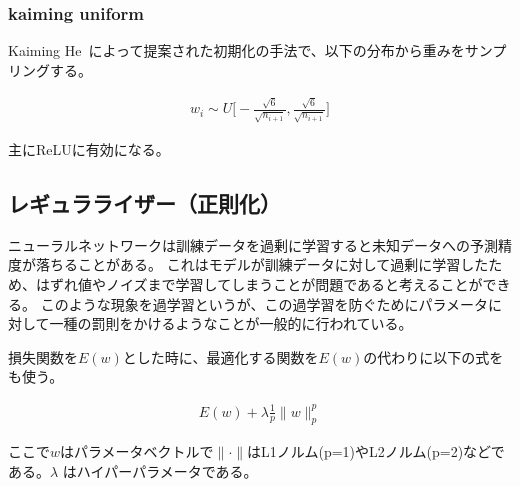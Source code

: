 \subsubsection{kaiming uniform}
Kaiming He~\cite{kaiming}によって提案された初期化の手法で、以下の分布から重みをサンプリングする。

\begin{eqnarray}
w_{i} \sim U \bigl[ - \frac{\sqrt{6}}{ \sqrt{n_{i+1}} }, \frac{\sqrt{6}}{ \sqrt{ n_{i+1} }} \bigr]
\end{eqnarray}

主にReLUに有効になる。


\subsection{レギュラライザー（正則化）}
ニューラルネットワークは訓練データを過剰に学習すると未知データへの予測精度が落ちることがある。
これはモデルが訓練データに対して過剰に学習したため、はずれ値やノイズまで学習してしまうことが問題であると考えることができる。
このような現象を過学習というが、この過学習を防ぐためにパラメータに対して一種の罰則をかけるようなことが一般的に行われている。

損失関数を$ E(w) $とした時に、最適化する関数を$E(w)$の代わりに以下の式をも使う。

\begin{eqnarray}
E(w) + \lambda \frac{1}{p}\|w\|^p_p
\label{eq:regu}
\end{eqnarray}


ここで$ w $はパラメータベクトルで$　\| \cdot \| $はL1ノルム(p=1)やL2ノルム(p=2)などである。$ \lambda $ はハイパーパラメータである。


